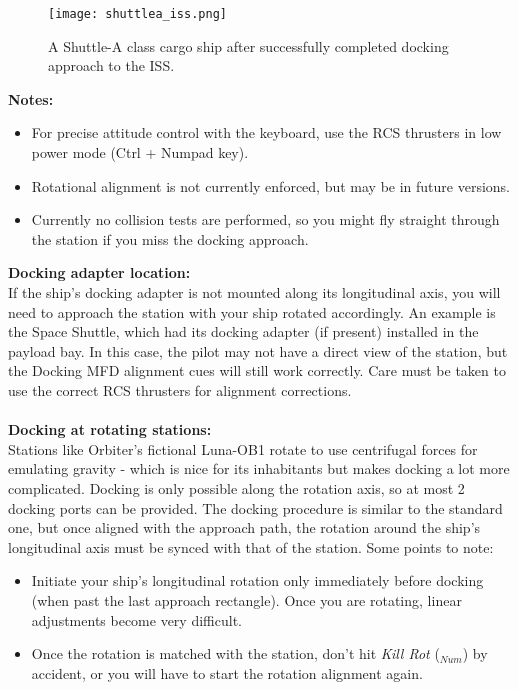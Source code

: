 \documentclass[Orbiter User Manual.tex]{subfiles}
\begin{document}
\begin{figure}[H]
	\centering
	\texttt{[image: shuttlea\_iss.png]}
	\caption{A Shuttle-A class cargo ship after successfully completed docking approach to the ISS.}
\end{figure}

\noindent
\textbf{Notes:}

\begin{itemize}
\item For precise attitude control with the keyboard, use the RCS thrusters in low power mode (Ctrl + Numpad key).
\item Rotational alignment is not currently enforced, but may be in future versions.
\item Currently no collision tests are performed, so you might fly straight through the station if you miss the docking approach.
\end{itemize}

\noindent
\textbf{Docking adapter location:}\\
If the ship's docking adapter is not mounted along its longitudinal axis, you will need to approach the station with your ship rotated accordingly. An example is the Space Shuttle, which had its docking adapter (if present) installed in the payload bay. In this case, the pilot may not have a direct view of the station, but the Docking MFD alignment cues will still work correctly. Care must be taken to use the correct RCS thrusters for alignment corrections.\\
\\
\textbf{Docking at rotating stations:}\\
Stations like Orbiter's fictional Luna-OB1 rotate to use centrifugal forces for emulating gravity - which is nice for its inhabitants but makes docking a lot more complicated. Docking is only possible along the rotation axis, so at most 2 docking ports can be provided. The docking procedure is similar to the standard one, but once aligned with the approach path, the rotation around the ship's longitudinal axis must be synced with that of the station. Some points to note:

\begin{itemize}
\item Initiate your ship's longitudinal rotation only immediately before docking (when past the last approach rectangle). Once you are rotating, linear adjustments become very difficult.
\item Once the rotation is matched with the station, don't hit \textit{Kill Rot} ($_{Num}$) by accident, or you will have to start the rotation alignment again.
\end{itemize}
\end{document}
